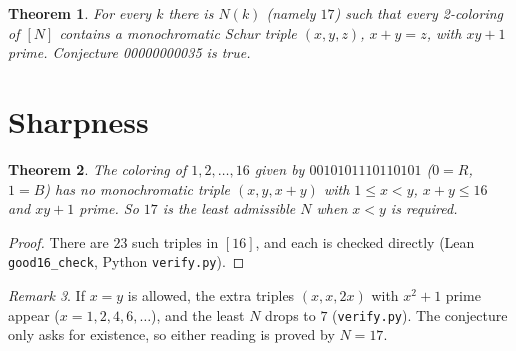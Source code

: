 \documentclass[11pt]{article}
\newtheorem{theorem}{Theorem}
\theoremstyle{remark}
\newtheorem{remark}[theorem]{Remark}
\begin{document}
\begin{theorem}
For every $k$ there is $N(k)$ (namely $17$) such that every 2-coloring of
$[N]$ contains a monochromatic Schur triple $(x,y,z)$, $x+y=z$, with $xy+1$
prime. Conjecture 00000000035 is true.
\end{theorem}

\section{Sharpness}
\begin{theorem}
The coloring of $1,2,\dots,16$ given by $0010101110110101$ ($0=R$, $1=B$) has no
monochromatic triple $(x,y,x+y)$ with $1\le x<y$, $x+y\le16$ and $xy+1$ prime.
So $17$ is the least admissible $N$ when $x<y$ is required.
\end{theorem}
\begin{proof}
There are $23$ such triples in $[16]$, and each is checked directly (Lean
\texttt{good16\_check}, Python \texttt{verify.py}).
\end{proof}

\begin{remark}
If $x=y$ is allowed, the extra triples $(x,x,2x)$ with $x^2+1$ prime appear
($x=1,2,4,6,\dots$), and the least $N$ drops to $7$ (\texttt{verify.py}). The
conjecture only asks for existence, so either reading is proved by $N=17$.
\end{remark}
\end{document}
